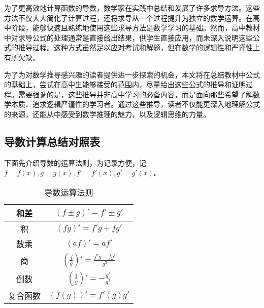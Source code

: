 

为了更高效地计算函数的导数，数学家在实践中总结和发展了许多求导方法。这些方法不仅大大简化了计算过程，还将求导从一个过程提升为独立的数学运算。在高中阶段，能够快速且熟练地使用这些求导方法是数学学习的基础。然而，高中教材中对求导公式的处理通常是直接给出结果，供学生直接应用，而未深入说明这些公式的推导过程。这种方式虽然足以应对考试和解题，但在数学的逻辑性和严谨性上有所欠缺。

为了为对数学推导感兴趣的读者提供进一步探索的机会，本文将在总结教材中公式的基础上，尝试在高中生能够接受的范围内，尽量给出这些公式的推导和证明过程。需要强调的是，这些推导并非高中学习的必备内容，而是面向那些希望了解数学本质、追求逻辑严谨性的学习者。通过这些推导，读者不仅能更深入地理解公式的来源，还能从中感受到数学推理的魅力，以及逻辑思维的力量。

\subsection{导数计算总结对照表}

下面先介绍导数的运算法则，为记录方便，记$f=f(x),g=g(x),f'=f'(x),g'=g'(x)$。
\begin{table}[ht]
\centering
\caption{导数运算法则}\label{tab_HsDerB1}
\begin{tabular}{|c|c|}
\hline
和差 & $(f\pm g)'=f'\pm g'$ \\
\hline
积 & $(fg)'=f'g+fg'$ \\
\hline
数乘 & $(af)'=af'$ \\
\hline
商 & $\displaystyle\left(\frac{f}{g}\right)'=\frac{f'g-fg'}{g^2}$ \\
\hline
倒数 & $\displaystyle\left(\frac{1}{g}\right)'=-\frac{g'}{g^2}$ \\
\hline
复合函数 & $(f(g))'=f'(g)g'$ \\
\hline
\end{tabular}
\end{table}

